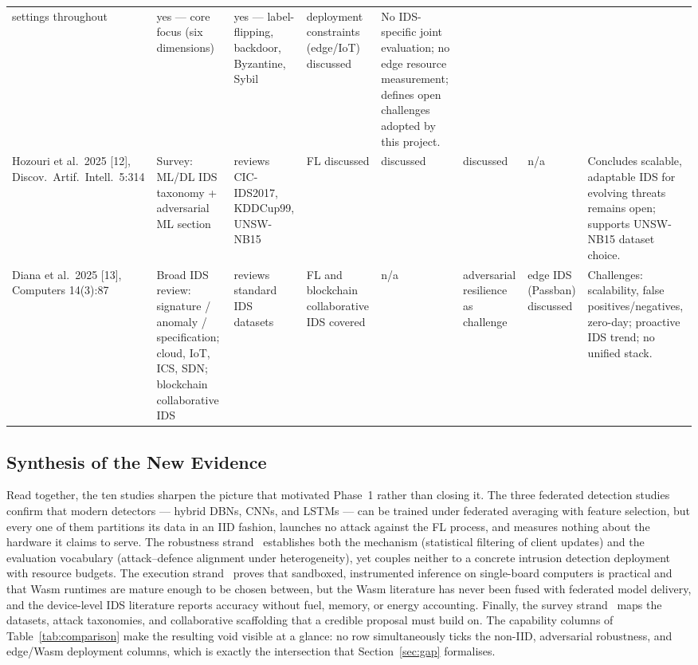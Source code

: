 \documentclass[11pt,a4paper]{article}
\begin{document}
\begin{landscape}
\begin{longtable}{L{2.9cm}L{3.1cm}L{2.4cm}L{2.6cm}L{1.3cm}L{2.1cm}L{2.7cm}L{4.4cm}}
settings throughout & yes --- core focus (six dimensions) & yes ---
label-flipping, backdoor, Byzantine, Sybil & deployment constraints
(edge/IoT) discussed & No IDS-specific joint evaluation; no edge resource
measurement; defines open challenges adopted by this project. \\
\addlinespace[2pt]
Hozouri et al.\ 2025 [12], Discov.\ Artif.\ Intell.\ 5:314 &
Survey: ML/DL IDS taxonomy + adversarial ML section & reviews CIC-IDS2017,
KDDCup99, UNSW-NB15 & FL discussed & discussed & discussed & n/a &
Concludes scalable, adaptable IDS for evolving threats remains open;
supports UNSW-NB15 dataset choice. \\
\addlinespace[2pt]
Diana et al.\ 2025 [13], Computers 14(3):87 &
Broad IDS review: signature / anomaly / specification; cloud, IoT, ICS,
SDN; blockchain collaborative IDS & reviews standard IDS datasets & FL and
blockchain collaborative IDS covered & n/a & adversarial resilience as
challenge & edge IDS (Passban) discussed & Challenges: scalability,
false positives/negatives, zero-day; proactive IDS trend; no unified
stack. \\
\end{longtable}
\endgroup
\end{landscape}

\subsection{Synthesis of the New Evidence}\label{sec:synthesis}

Read together, the ten studies sharpen the picture that motivated Phase~1
rather than closing it. The three federated detection
studies~\cite{albogami2025,karunamurthy2025,bensaid2025} confirm that
modern detectors --- hybrid DBNs, CNNs, and LSTMs --- can be trained under
federated averaging with feature selection, but every one of them
partitions its data in an IID fashion, launches no attack against the FL
process, and measures nothing about the hardware it claims to serve. The
robustness strand~\cite{rezaei2025,djemaa2026} establishes both the
mechanism (statistical filtering of client updates) and the evaluation
vocabulary (attack--defence alignment under heterogeneity), yet couples
neither to a concrete intrusion detection deployment with resource
budgets. The execution strand~\cite{zhang2025,berguiga2025} proves that
sandboxed, instrumented inference on single-board computers is practical
and that Wasm runtimes are mature enough to be chosen between, but the
Wasm literature has never been fused with federated model delivery, and
the device-level IDS literature reports accuracy without fuel, memory, or
energy accounting. Finally, the survey
strand~\cite{hozouri2025,diana2025,nandanwar2025} maps the datasets,
attack taxonomies, and collaborative scaffolding that a credible proposal
must build on. The capability columns of Table~\ref{tab:comparison} make
the resulting void visible at a glance: no row simultaneously ticks the
non-IID, adversarial robustness, and edge/Wasm deployment columns, which
is exactly the intersection that Section~\ref{sec:gap} formalises.
\end{document}

